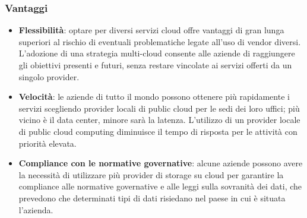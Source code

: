 \documentclass[a4paper]{article}
\begin{document}

\subsubsection{Vantaggi}
\begin{itemize}
    \item \textbf{Flessibilità}: optare per diversi servizi cloud offre vantaggi di gran lunga superiori al rischio di eventuali problematiche legate all'uso di vendor diversi. L'adozione di una strategia multi-cloud consente alle aziende di raggiungere gli obiettivi presenti e futuri, senza restare vincolate ai servizi offerti da un singolo provider.
    
    \item \textbf{Velocità}: le aziende di tutto il mondo possono ottenere più rapidamente i servizi scegliendo provider locali di public cloud per le sedi dei loro uffici; più vicino è il data center, minore sarà la latenza. L'utilizzo di un provider locale di public cloud computing diminuisce il tempo di risposta per le attività con priorità elevata.
    
    \item \textbf{Compliance con le normative governative}: alcune aziende possono avere la necessità di utilizzare più provider di storage su cloud per garantire la compliance alle normative governative e alle leggi sulla sovranità dei dati, che prevedono che determinati tipi di dati risiedano nel paese in cui è situata l'azienda.\cite{multicloud}
\end{itemize}
\newpage

\end{document}

